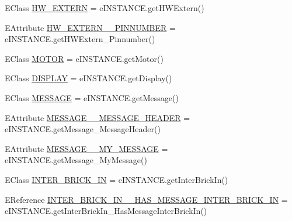 \begin{DoxyCompactItemize}
\item 
E\-Class \hyperlink{interfaceshootingmachineemfmodel_1_1_shootingmachineemfmodel_package_1_1_literals_a1cb9e63ff1a806fd94974a6efeb9b059}{H\-W\-\_\-\-E\-X\-T\-E\-R\-N} = e\-I\-N\-S\-T\-A\-N\-C\-E.\-get\-H\-W\-Extern()
\item 
E\-Attribute \hyperlink{interfaceshootingmachineemfmodel_1_1_shootingmachineemfmodel_package_1_1_literals_acedf689d2322132a8d5c7d94d8cf5283}{H\-W\-\_\-\-E\-X\-T\-E\-R\-N\-\_\-\-\_\-\-P\-I\-N\-N\-U\-M\-B\-E\-R} = e\-I\-N\-S\-T\-A\-N\-C\-E.\-get\-H\-W\-Extern\-\_\-\-Pinnumber()
\item 
E\-Class \hyperlink{interfaceshootingmachineemfmodel_1_1_shootingmachineemfmodel_package_1_1_literals_a7bbdd7d8cb18d53b305d394e8c42b4b8}{M\-O\-T\-O\-R} = e\-I\-N\-S\-T\-A\-N\-C\-E.\-get\-Motor()
\item 
E\-Class \hyperlink{interfaceshootingmachineemfmodel_1_1_shootingmachineemfmodel_package_1_1_literals_ab8f98900ea17ced20aa67f00e65df0ac}{D\-I\-S\-P\-L\-A\-Y} = e\-I\-N\-S\-T\-A\-N\-C\-E.\-get\-Display()
\item 
E\-Class \hyperlink{interfaceshootingmachineemfmodel_1_1_shootingmachineemfmodel_package_1_1_literals_ab0be4348efbb58889f96804263c8b934}{M\-E\-S\-S\-A\-G\-E} = e\-I\-N\-S\-T\-A\-N\-C\-E.\-get\-Message()
\item 
E\-Attribute \hyperlink{interfaceshootingmachineemfmodel_1_1_shootingmachineemfmodel_package_1_1_literals_ac9c85c0837360031ccab61c9f987e8c9}{M\-E\-S\-S\-A\-G\-E\-\_\-\-\_\-\-M\-E\-S\-S\-A\-G\-E\-\_\-\-H\-E\-A\-D\-E\-R} = e\-I\-N\-S\-T\-A\-N\-C\-E.\-get\-Message\-\_\-\-Message\-Header()
\item 
E\-Attribute \hyperlink{interfaceshootingmachineemfmodel_1_1_shootingmachineemfmodel_package_1_1_literals_a78d1aca63746e19f5af0adee1d42af50}{M\-E\-S\-S\-A\-G\-E\-\_\-\-\_\-\-M\-Y\-\_\-\-M\-E\-S\-S\-A\-G\-E} = e\-I\-N\-S\-T\-A\-N\-C\-E.\-get\-Message\-\_\-\-My\-Message()
\item 
E\-Class \hyperlink{interfaceshootingmachineemfmodel_1_1_shootingmachineemfmodel_package_1_1_literals_aad5124c60c5fe6faee5635ac2ef3005b}{I\-N\-T\-E\-R\-\_\-\-B\-R\-I\-C\-K\-\_\-\-I\-N} = e\-I\-N\-S\-T\-A\-N\-C\-E.\-get\-Inter\-Brick\-In()
\item 
E\-Reference \hyperlink{interfaceshootingmachineemfmodel_1_1_shootingmachineemfmodel_package_1_1_literals_adaa2b313cbad814d844e7d76cadded8c}{I\-N\-T\-E\-R\-\_\-\-B\-R\-I\-C\-K\-\_\-\-I\-N\-\_\-\-\_\-\-H\-A\-S\-\_\-\-M\-E\-S\-S\-A\-G\-E\-\_\-\-I\-N\-T\-E\-R\-\_\-\-B\-R\-I\-C\-K\-\_\-\-I\-N} = e\-I\-N\-S\-T\-A\-N\-C\-E.\-get\-Inter\-Brick\-In\-\_\-\-Has\-Message\-Inter\-Brick\-In()

\end{DoxyCompactItemize}

